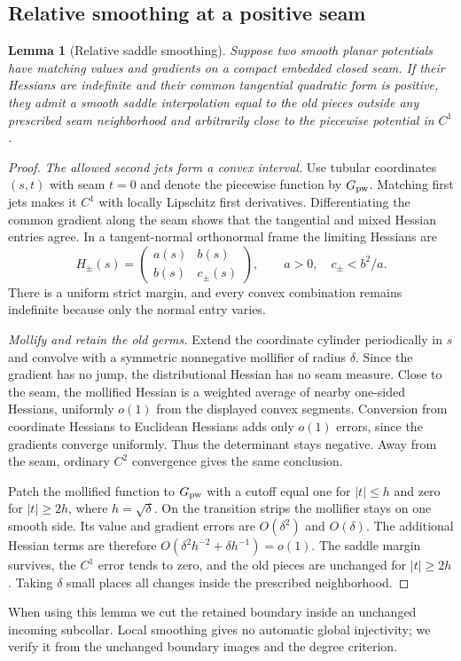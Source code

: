 \documentclass[11pt]{amsart}
\newtheorem{lemma}[theorem]{Lemma}
\theoremstyle{definition}
\theoremstyle{remark}
\numberwithin{equation}{section}
\begin{document}
\subsection{Relative smoothing at a positive seam}
\begin{lemma}[Relative saddle smoothing]\label{lem:smoothing}
Suppose two smooth planar potentials have matching values and gradients
on a compact embedded closed seam. If their Hessians are indefinite and
their common tangential quadratic form is positive, they admit a smooth
saddle interpolation equal to the old pieces outside any prescribed seam
neighborhood and arbitrarily close to the piecewise potential in $C^1$.
\end{lemma}
\begin{proof}
\emph{The allowed second jets form a convex interval.}
Use tubular coordinates $(s,t)$ with seam $t=0$ and denote the piecewise
function by $G_{\rm pw}$. Matching first jets makes it $C^1$ with locally
Lipschitz first derivatives. Differentiating the common gradient along
the seam shows that the tangential and mixed Hessian entries agree.
In a tangent-normal orthonormal frame the limiting Hessians are
\[
 H_\pm(s)=\begin{pmatrix}a(s)&b(s)\\b(s)&c_\pm(s)\end{pmatrix},
 \qquad a>0,\quad c_\pm<b^2/a.
\]
There is a uniform strict margin, and every convex combination remains
indefinite because only the normal entry varies.

\emph{Mollify and retain the old germs.}
Extend the coordinate cylinder periodically in $s$ and convolve with a
symmetric nonnegative mollifier of radius $\delta$. Since the gradient
has no jump, the distributional Hessian has no seam measure. Close to
the seam, the mollified Hessian is a weighted average of nearby one-sided
Hessians, uniformly $o(1)$ from the displayed convex segments. Conversion
from coordinate Hessians to Euclidean Hessians adds only $o(1)$ errors,
since the gradients converge uniformly. Thus the determinant stays negative.
Away from the seam, ordinary $C^2$ convergence gives the same conclusion.

Patch the mollified function to $G_{\rm pw}$ with a cutoff equal one for
$|t|\le h$ and zero for $|t|\ge2h$, where $h=\sqrt\delta$.
On the transition strips the mollifier stays on one smooth side.
Its value and gradient errors are $O(\delta^2)$ and $O(\delta)$.
The additional Hessian terms are therefore
$O(\delta^2h^{-2}+\delta h^{-1})=o(1)$. The saddle margin survives,
the $C^1$ error tends to zero, and the old pieces are unchanged for
$|t|\ge2h$. Taking $\delta$ small places all changes inside the prescribed
neighborhood.
\end{proof}
When using this lemma we cut the retained boundary inside an unchanged
incoming subcollar. Local smoothing gives no automatic global injectivity;
we verify it from the unchanged boundary images and the degree criterion.
\end{document}
